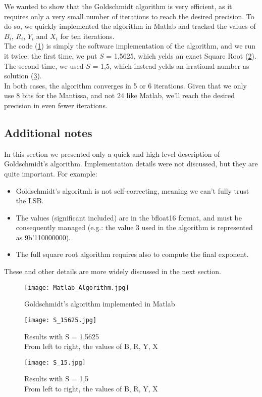 We wanted to show that the Goldschmidt algorithm is very efficient, as it requires only a very small number of iterations to reach the desired precision. To do so, we quickly implemented the algorithm in Matlab and tracked the values of $B_i$, $R_i$, $Y_i$ and $X_i$ for ten iterations.\\ The code (\ref{fig:Matlab_Algorithm}) is simply the software implementation of the algorithm, and we run it twice; the first time, we put $S$ = 1,5625, which yelds an exact Square Root (\ref{fig:S_15625}).  The second time, we used $S$ = 1,5, which instead yelds an irrational number as solution (\ref{fig:S_15}).\\
In both cases, the algorithm converges in 5 or 6 iterations. Given that we only use 8 bits for the Mantissa, and not 24 like Matlab, we'll reach the desired precision in even fewer iterations.

\subsection{Additional notes}
In this section we presented only a quick and high-level description of Goldschmidt's algorithm. Implementation details were not discussed, but they are quite important. For example:
\begin{itemize}
\item Goldschmidt's algoritmh is not self-correcting, meaning we can't fully trust the LSB.
\item The values (significant included) are in the bfloat16 format, and must be consequently managed (e.g.: the value 3 used in the algorithm is represented as 9b'110000000).
\item The full square root algorithm requires also to compute the final exponent.
\end{itemize}
These and other details are more widely discussed in the next section.
\begin{figure}[h]
	\centering
	\captionsetup{justification=centering}
	\texttt{[image: Matlab\_Algorithm.jpg]}	
	\caption{Goldschmidt's algorithm implemented in Matlab}
	\label {fig:Matlab_Algorithm}
\end{figure}

\begin{figure}[h]
	\centering
	\captionsetup{justification=centering}
	\texttt{[image: S\_15625.jpg]}	
	\caption{Results with S = 1,5625\\From left to right, the values of B, R, Y, X}
	\label {fig:S_15625}
\end{figure}


\begin{figure}[h]
	\centering
	\captionsetup{justification=centering}
	\texttt{[image: S\_15.jpg]}	
	\caption{Results with S = 1,5\\From left to right, the values of B, R, Y, X}
	\label {fig:S_15}
\end{figure}

\clearpage
